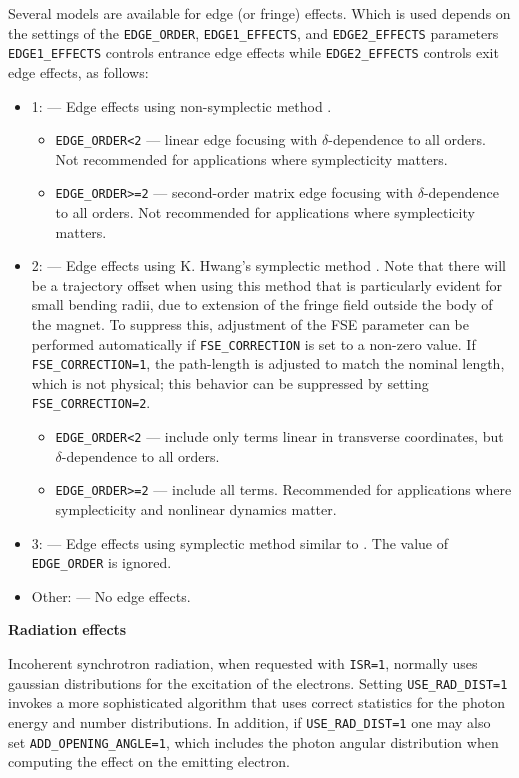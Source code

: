 Several models are available for edge (or fringe) effects. Which is used depends on the
settings of the \verb|EDGE_ORDER|, \verb|EDGE1_EFFECTS|, and \verb|EDGE2_EFFECTS| parameters
\verb|EDGE1_EFFECTS| controls entrance edge effects while \verb|EDGE2_EFFECTS| controls exit edge effects,
as follows:
\begin{itemize}
  \item 1: --- Edge effects using non-symplectic method \cite{KLBrown}. 
    \begin{itemize}
      \item \verb|EDGE_ORDER<2| --- linear edge focusing with $\delta$-dependence to all orders. Not recommended for
        applications where symplecticity matters. 
      \item \verb|EDGE_ORDER>=2| --- second-order matrix edge focusing with $\delta$-dependence to all orders. Not recommended for
        applications where symplecticity matters.
    \end{itemize}              
  \item 2: --- Edge effects using K. Hwang's symplectic method \cite{KHwang}. Note that there will be a
  trajectory offset when using this method that is particularly evident for small bending radii, due to extension of the
  fringe field outside the body of the magnet. To suppress this, adjustment of the FSE parameter can be performed automatically 
  if \verb|FSE_CORRECTION| is set to a non-zero value. If \verb|FSE_CORRECTION=1|, the path-length is adjusted to match the nominal
  length, which is not physical; this behavior can be suppressed by setting \verb|FSE_CORRECTION=2|.
    \begin{itemize}
      \item \verb|EDGE_ORDER<2| --- include only terms linear in transverse coordinates, but $\delta$-dependence to all orders.
      \item \verb|EDGE_ORDER>=2| --- include all terms. Recommended for applications where symplecticity and nonlinear dynamics
        matter.
    \end{itemize}              
  \item 3: --- Edge effects using symplectic method similar to \cite{KLBrown}. The value of \verb|EDGE_ORDER| is ignored.
  \item Other: --- No edge effects.
\end{itemize}

{\bf Radiation effects}

Incoherent synchrotron radiation, when requested with {\tt ISR=1},
normally uses gaussian distributions for the excitation of the electrons.
Setting {\tt USE\_RAD\_DIST=1} invokes a more sophisticated algorithm that
uses correct statistics for the photon energy and number distributions.
In addition, if {\tt USE\_RAD\_DIST=1} one may also set {\tt ADD\_OPENING\_ANGLE=1},
which includes the photon angular distribution when computing the effect on 
the emitting electron.  

